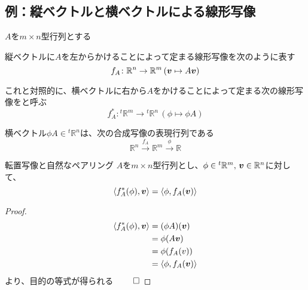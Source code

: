 \documentclass[../../../topic_linear-algebra]{subfiles}
\begin{document}
\subsection{例：縦ベクトルと横ベクトルによる線形写像}


\br

$A$を$m \times n$型行列とする

\br

縦ベクトルに$A$を左からかけることによって定まる線形写像を次のように表す
\begin{equation*}
  f_A \colon \mathbb{R}^n \to \mathbb{R}^m \, (\vb*{v} \mapsto A \vb*{v})
\end{equation*}

\br

これと対照的に、横ベクトルに右から$A$をかけることによって定まる次の線形写像をと呼ぶ
\begin{equation*}
  f_A^* \colon {}^t\mathbb{R}^m \to {}^t\mathbb{R}^n \, (\phi \mapsto \phi A)
\end{equation*}

\br

横ベクトル$\phi A \in {}^t\mathbb{R}^n$は、次の合成写像の表現行列である
\begin{equation*}
  \mathbb{R}^n \xrightarrow{f_A} \mathbb{R}^m \xrightarrow{\phi} \mathbb{R}
\end{equation*}

\br

\begin{theorem}{転置写像と自然なペアリング}
  $A$を$m \times n$型行列とし、$\phi \in {}^t\mathbb{R}^m,\,\vb*{v} \in \mathbb{R}^n$に対して、
  \begin{equation*}
    \langle f_A^*(\phi), \vb*{v} \rangle = \langle \phi, f_A(\vb*{v}) \rangle
  \end{equation*}
\end{theorem}

\begin{proof}
  \begin{align*}
    \langle f_A^*(\phi), \vb*{v} \rangle & = (\phi A)(\vb*{v})                  \\
                                         & = \phi(A \vb*{v})                    \\
                                         & = \phi(f_A \vb({v}))                 \\
                                         & = \langle \phi, f_A(\vb*{v}) \rangle
  \end{align*}
  より、目的の等式が得られる $\qed$
\end{proof}
\end{document}
